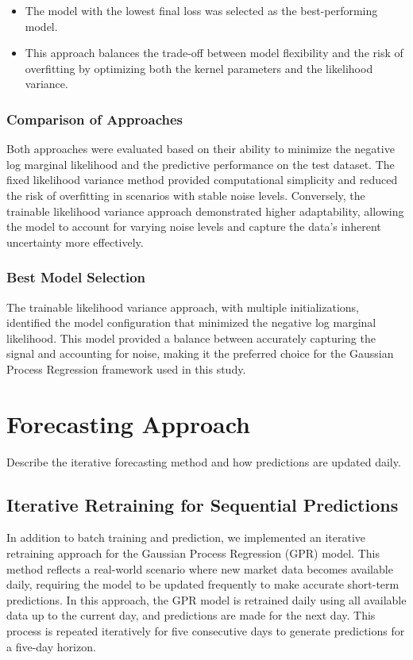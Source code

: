\begin{itemize}
    \item The model with the lowest final loss was selected as the best-performing model.
    \item This approach balances the trade-off between model flexibility and the risk of overfitting by optimizing both the kernel parameters and the likelihood variance.
\end{itemize}

\subsubsection{Comparison of Approaches}

Both approaches were evaluated based on their ability to minimize the negative log marginal likelihood and the predictive performance on the test dataset. The fixed likelihood variance method provided computational simplicity and reduced the risk of overfitting in scenarios with stable noise levels. Conversely, the trainable likelihood variance approach demonstrated higher adaptability, allowing the model to account for varying noise levels and capture the data's inherent uncertainty more effectively.

\subsubsection{Best Model Selection}

The trainable likelihood variance approach, with multiple initializations, identified the model configuration that minimized the negative log marginal likelihood. This model provided a balance between accurately capturing the signal and accounting for noise, making it the preferred choice for the Gaussian Process Regression framework used in this study.


\section{Forecasting Approach}
Describe the iterative forecasting method and how predictions are updated daily.

\subsection{Iterative Retraining for Sequential Predictions}

In addition to batch training and prediction, we implemented an iterative retraining approach for the Gaussian Process Regression (GPR) model. This method reflects a real-world scenario where new market data becomes available daily, requiring the model to be updated frequently to make accurate short-term predictions. In this approach, the GPR model is retrained daily using all available data up to the current day, and predictions are made for the next day. This process is repeated iteratively for five consecutive days to generate predictions for a five-day horizon.

